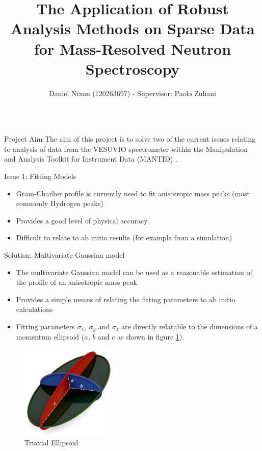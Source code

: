 \documentclass[xcolor={dvipsnames}]{beamer}
\title{
  The Application of Robust Analysis Methods on Sparse Data for Mass-Resolved
  Neutron Spectroscopy}
\author{Daniel Nixon (120263697) - Supervisor: Paolo Zuliani}
\begin{document}
\begin{frame}{}
  \begin{columns}[t]
    \begin{column}{.49\linewidth}
      \begin{block}{\LARGE Project Aim}
        The aim of this project is to solve two of the current issues relating
        to analysis of data from the VESUVIO spectrometer within the
        Manipulation and Analysis Toolkit for Instrument Data (MANTID)
        \cite{mantid}.
      \end{block}

      \begin{block}{\LARGE Issue 1: Fitting Models}
        \begin{itemize}
            \item Gram-Charlier profile is currently used to fit anisotropic
                  mass peaks (most commonly Hydrogen peaks)
            \item Provides a good level of physical accuracy
            \item Difficult to relate to ab initio results (for example from a
                  simulation)
        \end{itemize}
      \end{block}

      \begin{block}{\LARGE Solution: Multivariate Gaussian model}
        \begin{itemize}
          \item The multivariate Gaussian model can be used as a reasonable
                estimation of the profile of an anisotropic mass peak
          \item Provides a simple means of relating the fitting parameters to ab
                initio calculations
          \item Fitting parameters $\sigma_{x}$, $\sigma_{y}$ and $\sigma_{z}$
                are directly relatable to the dimensions of a momentum ellipsoid
                ($a$, $b$ and $c$ as shown in figure
                \ref{fig:triaxial_ellipsoid}).
        \end{itemize}

        \begin{figure}[h!]
          \centering
          \includegraphics[width=0.4\textwidth]{graphics/Triaxial_Ellipsoid.eps}
          \caption{Triaxial Ellipsoid \cite{ellipsoid}}
          \label{fig:triaxial_ellipsoid}
        \end{figure}


\end{block}
\end{column}
\end{columns}
\end{frame}
\end{document}
